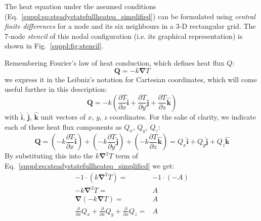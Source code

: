 The heat equation under the assumed conditions (Eq.~\ref{suppl:eq:steadystatefullheateq_simplified}) can be formulated using \textit{central finite differences} for a node and its six neighbours in a 3-D rectangular grid.
The 7-node \textit{stencil} of this nodal configuration (i.e. its graphical representation) is shown in Fig.~\ref{suppl:fig:stencil}.

Remembering Fourier's law of heat conduction, which defines heat flux $Q$:
\begin{equation}
    \label{suppl:eq:HeatFlux}
    \bm{Q} = -k \bm{\nabla} T
\end{equation}
we express it in the Leibniz's notation for Cartesian coordinates, which will come useful further in this description:
\begin{equation}
    \label{suppl:eq:HeatFlux_3D}
    \bm{Q} =
        -k \left( 
            \frac{\partial T}{\partial x} \bm{\hat{i}} +
            \frac{\partial T}{\partial y} \bm{\hat{j}} +
            \frac{\partial T}{\partial z} \bm{\hat{k}}
        \right)
\end{equation}
with $\bm{\hat{i}}$, $\bm{\hat{j}}$, $\bm{\hat{k}}$ unit vectors of $x$, $y$, $z$ coordinates.
For the sake of clarity, we indicate each of these heat flux components as $Q_x$, $Q_y$, $Q_z$:
\begin{equation}
    \label{suppl:eq:HeatFlux_3D_component}
    \bm{Q} = 
    \left(-k \frac{\partial T}{\partial x} \bm{\hat{i}} \right) +
    \left(-k \frac{\partial T}{\partial y} \bm{\hat{j}} \right) +
    \left(-k \frac{\partial T}{\partial z} \bm{\hat{k}} \right) =
    Q_x \bm{\hat{i}} + Q_y \bm{\hat{j}} + Q_z \bm{\hat{k}}
\end{equation}
By substituting this into the $k \bm{\nabla}^2 T$ term of Eq.~\ref{suppl:eq:steadystatefullheateq_simplified} we get:
\begin{align}
    \label{suppl:eq:steadystatefullheateq_simplified_Q}
    -1 \cdot (k \bm{\nabla}^2 T) = & -1 \cdot (- A) \nonumber \\
    -k \bm{\nabla}^2 T = & A \nonumber \\
    \bm{\nabla} (-k \bm{\nabla} T) = & A \nonumber \\
    \frac{\partial}{\partial x} Q_x +
    \frac{\partial}{\partial x} Q_y +
    \frac{\partial}{\partial x} Q_z = & A
\end{align}


